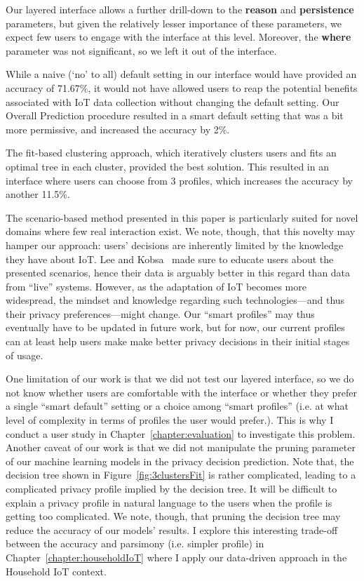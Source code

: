 Our layered interface allows a further drill-down to the \textbf{reason} and \textbf{persistence} parameters, but given the relatively lesser importance of these parameters, we expect few users to engage with the interface at this level. Moreover, the \textbf{where} parameter was not significant, so we left it out of the interface.

While a naive (`no' to all) default setting in our interface would have provided an accuracy of 71.67\%, it would not have allowed users to reap the potential benefits associated with IoT data collection without changing the default setting. Our Overall Prediction procedure resulted in a smart default setting that was a bit more permissive, and increased the accuracy by 2\%.

The fit-based clustering approach, which iteratively clusters users and fits an optimal tree in each cluster, provided the best solution. This resulted in an interface where users can choose from 3 profiles, which increases the accuracy by another 11.5\%.

The scenario-based method presented in this paper is particularly suited for novel domains where few real interaction exist. We note, though, that this novelty may hamper our approach: users' decisions are inherently limited by the knowledge they have about IoT. Lee and Kobsa~\cite{lee2016understanding} made sure to educate users about the presented scenarios, hence their data is arguably better in this regard than data from ``live'' systems. However, as the adaptation of IoT becomes more widespread, the mindset and knowledge regarding such technologies---and thus their privacy preferences---might change. Our ``smart profiles'' may thus eventually have to be updated in future work, but for now, our current profiles can at least help users make make better privacy decisions in their initial stages of usage.

One limitation of our work is that we did not test our layered interface, so we do not know whether users are comfortable with the interface or whether they prefer a single ``smart default'' setting or a choice among ``smart profiles'' (i.e.  at what level of complexity in terms of profiles the user would prefer.). This is why I conduct a user study in Chapter~\ref{chapter:evaluation} to investigate this problem. Another caveat of our work is that we did not manipulate the pruning parameter of our machine learning models in the privacy decision prediction. Note that, the decision tree shown in Figure~\ref{fig:3clustersFit} is rather complicated, leading to a complicated privacy profile implied by the decision tree. It will be difficult to explain a privacy profile in natural language to the users when the profile is getting too complicated. We note, though, that pruning the decision tree may reduce the accuracy of our models' results. I explore this interesting trade-off between the accuracy and parsimony (i.e. simpler profile) in Chapter~\ref{chapter:householdIoT} where I apply our data-driven approach in the Household IoT context. 

